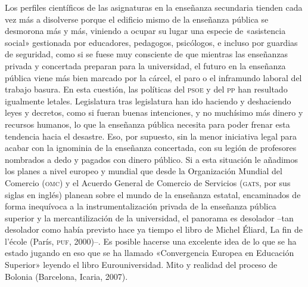 \documentclass[draft,9pt,letterpaper,twocolumn,openany]{extbook}
\begin{document}
Los perfiles científicos de las asignaturas en la enseñanza secundaria tienden cada vez más a disolverse porque el edificio mismo de la enseñanza pública se desmorona más y más, viniendo a ocupar su lugar una especie
de «asistencia social» gestionada por educadores, pedagogos, psicólogos, e incluso por guardias de seguridad, como si se fuese muy consciente de que mientras
las enseñanzas privada y concertada preparan para la universidad, el futuro en la
enseñanza pública viene más bien marcado por la cárcel, el paro o el inframundo
laboral del trabajo basura. En esta cuestión, las políticas del \textsc{psoe} y del \textsc{pp} han
resultado igualmente letales. Legislatura tras legislatura han ido haciendo y deshaciendo leyes y decretos, como si fueran buenas intenciones, y no muchísimo
más dinero y recursos humanos, lo que la enseñanza pública necesita para poder
frenar esta tendencia hacia el desastre. Eso, por supuesto, sin la menor iniciativa
legal para acabar con la ignominia de la enseñanza concertada, con su legión de
profesores nombrados a dedo y pagados con dinero público. Si a esta situación le
añadimos los planes a nivel europeo y mundial que desde la Organización Mundial
del Comercio (\textsc{omc}) y el Acuerdo General de Comercio de Servicios (\textsc{gats}, por sus
siglas en inglés) planean sobre el mundo de la enseñanza estatal, encaminados
de forma inequívoca a la instrumentalización privada de la enseñanza pública superior y la mercantilización de la universidad, el panorama es desolador –tan desolador como había previsto hace ya tiempo el libro de Michel Éliard, La fin de l’école (París, \textsc{puf}, 2000)–. Es posible hacerse una excelente idea de lo que se ha
estado jugando en eso que se ha llamado «Convergencia Europea en Educación
Superior» leyendo el libro Eurouniversidad. Mito y realidad del proceso de Bolonia
(Barcelona, Icaria, 2007).
\end{document}
